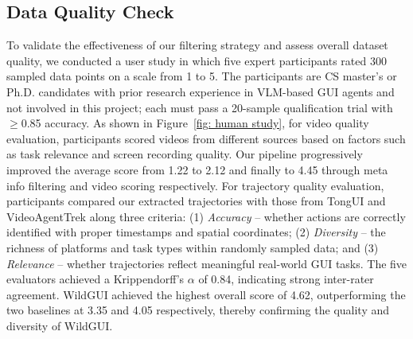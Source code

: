 \documentclass{article}
\theoremstyle{plain}
\theoremstyle{definition}
\theoremstyle{remark}
\newcommand{\ourdataset}{WildGUI}
\begin{document}

\subsection{Data Quality Check}
To validate the effectiveness of our filtering strategy and assess overall dataset quality, we conducted a user study in which five expert participants rated 300 sampled data points on a scale from 1 to 5. The participants are CS master's or Ph.D. candidates with prior research experience in VLM-based GUI agents and not involved in this project; each must pass a 20-sample qualification trial with $\geq$0.85 accuracy. 
As shown in Figure~\ref{fig: human study}, for video quality evaluation, participants scored videos from different sources based on factors such as task relevance and screen recording quality. Our pipeline progressively improved the average score from 1.22 to 2.12 and finally to 4.45 through meta info filtering and video scoring respectively. 
For trajectory quality evaluation, participants compared our extracted trajectories with those from TongUI and VideoAgentTrek along three criteria: (1) \textit{Accuracy} -- whether actions are correctly identified with proper timestamps and spatial coordinates; (2) \textit{Diversity} -- the richness of platforms and task types within randomly sampled data; and (3) \textit{Relevance} -- whether trajectories reflect meaningful real-world GUI tasks. The five evaluators achieved a Krippendorff's $\alpha$ of 0.84, indicating strong inter-rater agreement. \ourdataset{} achieved the highest overall score of 4.62, outperforming the two baselines at 3.35 and 4.05 respectively, thereby confirming the quality and diversity of \ourdataset{}.
\end{document}
